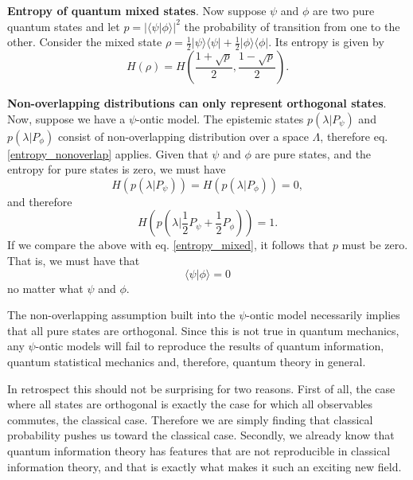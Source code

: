 \documentclass[10pt,twocolumn, nofootinbib]{revtex4-2}
\begin{document}
\textbf{Entropy of quantum mixed states}. Now suppose $\psi$ and $\phi$ are two pure quantum states and let $p = | \langle \psi | \phi \rangle |^2$ the probability of transition from one to the other. Consider the mixed state $\rho = \frac{1}{2} | \psi \rangle \langle \psi | + \frac{1}{2} | \phi \rangle \langle \phi |$. Its entropy is given by
\begin{equation}\label{entropy_mixed}
	H(\rho) = H\left(\frac{1+\sqrt{p}}{2}, \frac{1-\sqrt{p}}{2}\right).
\end{equation}

\textbf{Non-overlapping distributions can only represent orthogonal states}. Now, suppose we have a $\psi$-ontic model. The epistemic states $p(\lambda|P_\psi)$ and $p(\lambda|P_\phi)$ consist of non-overlapping distribution over a space $\Lambda$, therefore eq. \ref{entropy_nonoverlap} applies. Given that $\psi$ and $\phi$ are pure states, and the entropy for pure states is zero, we must have
\begin{equation}\label{entropy_pure}
	H(p(\lambda|P_\psi)) = H(p(\lambda|P_\phi)) = 0,
\end{equation}
and therefore
\begin{equation}\label{required_entropy}
	H\left(p(\lambda|\frac{1}{2}P_\psi + \frac{1}{2}P_\phi)\right) = 1.
\end{equation}
If we compare the above with eq. \ref{entropy_mixed}, it follows that $p$ must be zero. That is, we must have that
\begin{equation}\label{orthogonal}
	 \langle \psi | \phi \rangle = 0
\end{equation}
no matter what $\psi$ and $\phi$.

The non-overlapping assumption built into the $\psi$-ontic model necessarily implies that all pure states are orthogonal. Since this is not true in quantum mechanics, any $\psi$-ontic models will fail to reproduce the results of quantum information, quantum statistical mechanics and, therefore, quantum theory in general.

In retrospect this should not be surprising for two reasons. First of all, the case where all states are orthogonal is exactly the case for which all observables commutes, the classical case. Therefore we are simply finding that classical probability pushes us toward the classical case. Secondly, we already know that quantum information theory has features that are not reproducible in classical information theory, and that is exactly what makes it such an exciting new field.
\end{document}
